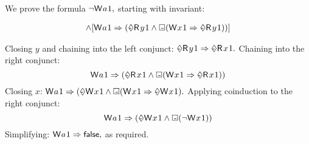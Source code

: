 \begin{example}
We prove the formula
\begin{math}
  \lnot\DW{a}{1},
\end{math}
starting with invariant:
\begin{scope}
\small
\begin{align*}
  [\once\DW{y}{1} \Rightarrow \once\DR{x}{1}]
  \land
  [\notonce\DW{a}{1} \Rightarrow (\once\DR{y}{1} \land \always(\DW{x}{1} \Rightarrow \once\DR{y}{1}))]
\end{align*}
\end{scope}
Closing $y$ and chaining into the left conjunct:
\begin{math}
  \once\DR{y}{1} \Rightarrow \once\DR{x}{1}.
\end{math}
Chaining into the right conjunct:
\begin{displaymath}
  \notonce\DW{a}{1} \Rightarrow (\once\DR{x}{1} \land \always(\DW{x}{1} \Rightarrow \once\DR{x}{1}))
\end{displaymath}
Closing $x$:
\begin{math}
  \notonce\DW{a}{1} \Rightarrow (\once\DW{x}{1} \land \always(\DW{x}{1} \Rightarrow \once\DW{x}{1}).
\end{math}
Applying coinduction to the right conjunct:
\begin{displaymath}
  \notonce\DW{a}{1} \Rightarrow (\once\DW{x}{1} \land \always(\lnot \DW{x}{1}))
\end{displaymath}
Simplifying:
\begin{math}
  \notonce\DW{a}{1} \Rightarrow \FALSE,
\end{math}
as required.
\end{example}


